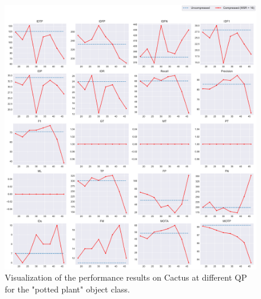 \begin{figure}[!tb]
  \centering
  \includegraphics[width=1.0\linewidth]{img/Cactus_58_multiplots_qp.pdf}
  \caption[Visualization of the performance results on Cactus at different QP for the "potted plant" object class]
  {
     Visualization of the performance results on Cactus at different QP for the "potted plant" object class.
  }
  \label{fig:Cactus_58_multiplots_qp}
\end{figure}